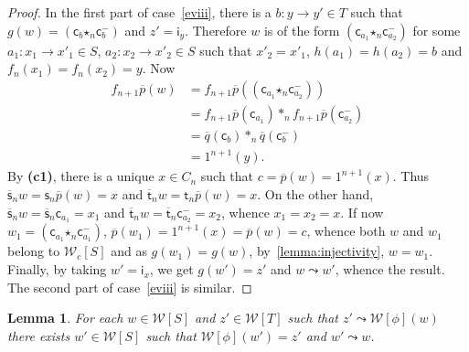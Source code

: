\documentclass[reqno]{amsart}
\theoremstyle{plain}
\newtheorem{lemma}[subsubsection]{Lemma}
\theoremstyle{definition}
\theoremstyle{remark}
\newcommand{\source}{\mathsf{s}} %
\newcommand{\target}{\mathsf{t}} %
\newcommand{\unit}[1]{1^{#1}} %
\newcommand{\comp}[1]{\ast_{#1}} %
\newcommand{\sce}[1]{\source_{#1}} %
\newcommand{\tge}[1]{\target_{#1}} %
\newcommand{\WW}{\mathcal{W}}
\newcommand{\wtx}[1]{\WW[#1]} %
\newcommand{\wtxr}[2]{\WW_{#1}[#2]} %
\newcommand{\formal}[1]{\mathsf{#1}} %
\newcommand{\fcst}[1]{\formal{c}_{#1}} %
\newcommand{\finv}[1]{\formal{c}^{\boldsymbol{-}}_{#1}}%
\newcommand{\fid}[1]{\formal{i}_{#1}} %
\newcommand{\fcomp}[1]{\bm{\star}_{#1}} %
\newcommand{\frel}{\leadsto} %
\newcommand{\scex}[1]{\extend{\source}_{#1}}
\newcommand{\tgex}[1]{\extend{\target}_{#1}}
\newcommand{\extend}[1]{\overline{#1}} %
\newcommand{\cndi}{\textbf{(c1)}} %
\begin{document}
\begin{proof}
In the first part of
   case~\ref{eviii}, there is a $b:y\to y'\in T$ such that $g(w)=(\fcst b\fcomp
   n\finv b)$ and $z'=\fid y$. Therefore $w$ is of the form $(\fcst{a_1}\fcomp 
   n\finv{a_2})$ for some $a_1:x_1\to x'_1\in S$,  $a_2:x_2\to x'_2\in
   S$ such that $x'_2=x'_1$, $h(a_1)=h(a_2)=b$ and
   $f_n(x_1)=f_n(x_2)=y$.  Now
   \begin{align*}
     f_{n+1}\extend p(w) & = f_{n+1}\extend p((\fcst{a_1}\fcomp n\finv{a_2}))\\
                                     & = f_{n+1}\extend p(\fcst{a_1})\comp n
                                       f_{n+1}\extend p(\finv{a_2})\\
                                     & = \extend q(\fcst b)\comp
                                       n\extend q(\finv b)\\
                                     & = \unit{n+1}(y).
   \end{align*}
   By  \cndi, there is a unique $x\in C_n$ such that
   $c=\extend p(w)=\unit{n+1}(x)$. Thus $\scex nw=\sce n\extend p(w)=x$
   and $\tgex nw=\tge n\extend p(w)=x$. On the other hand, $\scex
   nw=\scex n \fcst{a_1}=x_1$ and $\tgex nw=\tgex n\finv{a_2}=x_2$,
   whence $x_1=x_2=x$. If now $w_1=(\fcst{a_1}\fcomp n\finv{a_1})$,
   $\extend p(w_1)=\unit{n+1}(x)=\extend p(w)=c$, whence both $w$ and
   $w_1$
   belong to $\wtxr cS$ and as 
   $g(w_1)=g(w)$, by~\cref{lemma:injectivity}, $w=w_1$. Finally, by taking
   $w'=\fid x$, we get $g(w')=z'$ and $w\frel w'$, whence the result.
The second part of case~\ref{eviii} is similar.
 \end{proof}
 \begin{lemma}\label{lemma:backward_lift_frel}
 For each $w\in \wtx S$ and $z'\in\wtx
 T$ such that $z'\frel\wtx{\phi}(w)$ there exists $w'\in\wtx S$ such
 that $\wtx\phi(w')=z'$ and $w'\frel w$.
\end{lemma}
\end{document}
